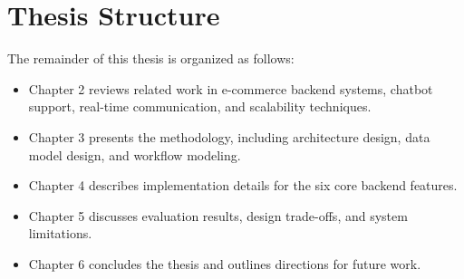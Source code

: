 \section{Thesis Structure}

The remainder of this thesis is organized as follows:
\begin{itemize}
    \item Chapter 2 reviews related work in e-commerce backend systems, chatbot support, real-time communication, and scalability techniques.
    \item Chapter 3 presents the methodology, including architecture design, data model design, and workflow modeling.
    \item Chapter 4 describes implementation details for the six core backend features.
    \item Chapter 5 discusses evaluation results, design trade-offs, and system limitations.
    \item Chapter 6 concludes the thesis and outlines directions for future work.
\end{itemize}
